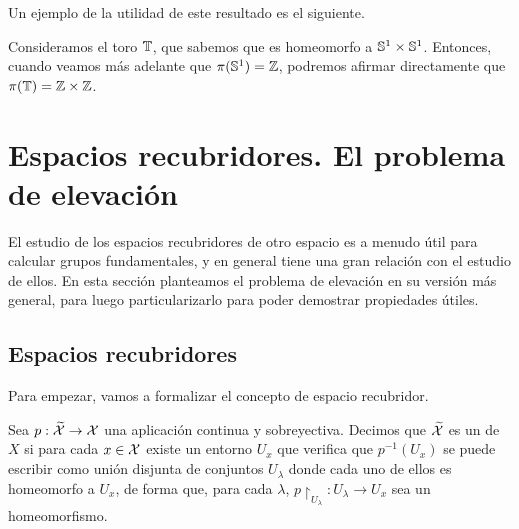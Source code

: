 Un ejemplo de la utilidad de este resultado es el siguiente.

\begin{exa}
	Consideramos el toro $\mathbb{T}$, que sabemos que es homeomorfo a $\mathbb{S}^1\times\mathbb{S}^1$. Entonces, cuando veamos más adelante que $\pi(\mathbb{S}^1)=\mathbb{Z}$, podremos afirmar directamente que $\pi(\mathbb{T})=\mathbb{Z}\times\mathbb{Z}$.
\end{exa}

\section{Espacios recubridores. El problema de elevación}

El estudio de los espacios recubridores de otro espacio es a menudo útil para calcular grupos fundamentales, y en general tiene una gran relación con el estudio de ellos. En esta sección planteamos el problema de elevación en su versión más general, para luego particularizarlo para poder demostrar propiedades útiles.

\subsection{Espacios recubridores}

Para empezar, vamos a formalizar el concepto de espacio recubridor.

\begin{defi}
	Sea $p:\widetilde{\mathcal{X}}\to \mathcal{X}$ una aplicación continua y sobreyectiva. Decimos que $\widetilde{\mathcal{X}}$ es un  de $X$ si para cada $x\in\mathcal{X}$ existe un entorno $U_x$ que verifica que $p^{-1}(U_x)$ se puede escribir como unión disjunta de conjuntos $U_\lambda$ donde cada uno de ellos es homeomorfo a $U_x$, de forma que, para cada $\lambda$, $p\restriction_{U_\lambda}:U_\lambda\to U_x$ sea un homeomorfismo.
\end{defi}

